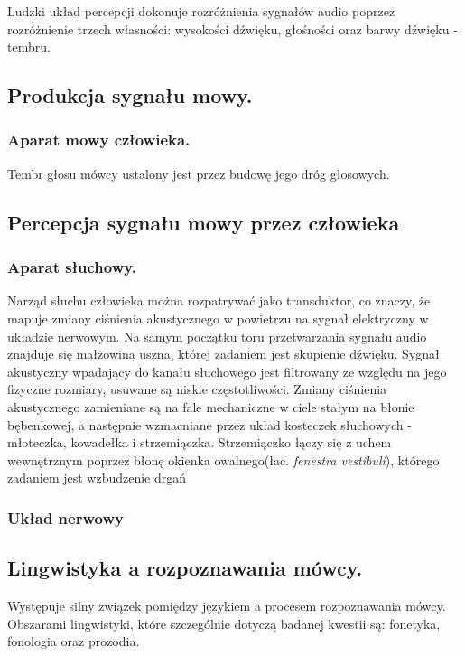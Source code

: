 Ludzki układ percepcji dokonuje rozróżnienia sygnałów audio poprzez rozróżnienie trzech własności: wysokości dźwięku, głośności oraz barwy dźwięku - tembru. 
%
\subsection{Produkcja sygnału mowy.}

\subsubsection{Aparat mowy człowieka.}
Tembr głosu mówcy ustalony jest przez budowę jego dróg głosowych.

\subsection{Percepcja sygnału mowy przez człowieka}

\subsubsection{Aparat słuchowy.}
Narząd słuchu człowieka można rozpatrywać jako transduktor, co znaczy, że mapuje zmiany ciśnienia akustycznego w powietrzu na sygnał elektryczny w układzie nerwowym. Na samym początku toru przetwarzania sygnału audio znajduje się małżowina uszna, której zadaniem jest skupienie dźwięku. Sygnał akustyczny wpadający do kanału słuchowego jest filtrowany ze względu na jego fizyczne rozmiary, usuwane są niskie częstotliwości. Zmiany ciśnienia akustycznego zamieniane są na fale mechaniczne w ciele stałym na błonie bębenkowej, a następnie wzmacniane przez układ kosteczek słuchowych - młoteczka, kowadełka i strzemiączka. Strzemiączko łączy się z uchem wewnętrznym poprzez błonę okienka owalnego(łac. \textit{fenestra vestibuli}), którego zadaniem jest wzbudzenie drgań %

\subsubsection{Układ nerwowy}

\subsection{Lingwistyka a rozpoznawania mówcy.}

Występuje silny związek pomiędzy językiem a procesem rozpoznawania mówcy. Obszarami lingwistyki, które szczególnie dotyczą badanej kwestii są: fonetyka, fonologia oraz prozodia.


